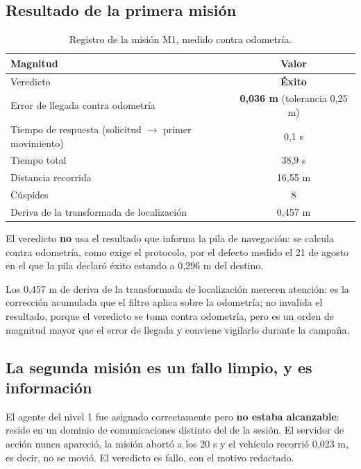 \documentclass[12pt,letterpaper]{article}
\begin{document}
\subsection{Resultado de la primera misión}

\begin{table}[H]
    \centering
    \small
    \caption{Registro de la misión M1, medido contra odometría.}
    \label{tab:m1}
    \begin{tabular}{@{}lc@{}}
        \toprule
        \textbf{Magnitud} & \textbf{Valor} \\ \midrule
        Veredicto & \textbf{Éxito} \\
        Error de llegada contra odometría & \textbf{0,036 m} (tolerancia 0,25 m) \\
        Tiempo de respuesta (solicitud $\rightarrow$ primer movimiento) & 0,1 s \\
        Tiempo total & 38,9 s \\
        Distancia recorrida & 16,55 m \\
        Cúspides & 8 \\
        Deriva de la transformada de localización & 0,457 m \\ \bottomrule
    \end{tabular}
\end{table}

El veredicto \textbf{no} usa el resultado que informa la pila de navegación: se calcula contra odometría, como exige el protocolo, por el defecto medido el 21 de agosto en el que la pila declaró éxito estando a 0,296 m del destino.

Los 0,457 m de deriva de la transformada de localización merecen atención: es la corrección acumulada que el filtro aplica sobre la odometría; no invalida el resultado, porque el veredicto se toma contra odometría, pero es un orden de magnitud mayor que el error de llegada y conviene vigilarlo durante la campaña.

\subsection{La segunda misión es un fallo limpio, y es información}

El agente del nivel 1 fue asignado correctamente pero \textbf{no estaba alcanzable}: reside en un dominio de comunicaciones distinto del de la sesión. El servidor de acción nunca apareció, la misión abortó a los 20 s y el vehículo recorrió 0,023 m, es decir, no se movió. El veredicto es fallo, con el motivo redactado.
\end{document}
